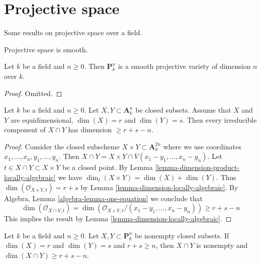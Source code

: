 \section{Projective space}
\label{section-projective-space}

\noindent
Some results on projective space over a field.

\begin{lemma}
\label{lemma-projective-space-smooth}
\begin{slogan}
Projective space is smooth.
\end{slogan}
Let $k$ be a field and $n \geq 0$. Then $\mathbf{P}^n_k$ is a
smooth projective variety of dimension $n$ over $k$.
\end{lemma}

\begin{proof}
Omitted.
\end{proof}

\begin{lemma}
\label{lemma-intersection-in-affine-space}
Let $k$ be a field and $n \geq 0$. Let $X, Y \subset \mathbf{A}^n_k$
be closed subsets. Assume that $X$ and $Y$ are equidimensional,
$\dim(X) = r$ and $\dim(Y) = s$.
Then every irreducible component of $X \cap Y$ has dimension $\geq r + s - n$.
\end{lemma}

\begin{proof}
Consider the closed subscheme $X \times Y \subset \mathbf{A}^{2n}_k$
where we use coordinates $x_1, \ldots, x_n, y_1, \ldots, y_n$. Then
$X \cap Y = X \times Y \cap V(x_1 - y_1, \ldots, x_n - y_n)$.
Let $t \in X \cap Y \subset X \times Y$ be a closed point.
By Lemma \ref{lemma-dimension-product-locally-algebraic}
we have $\dim_t(X \times Y) = \dim(X) + \dim(Y)$.
Thus $\dim(\mathcal{O}_{X \times Y, t}) = r + s$ by
Lemma \ref{lemma-dimension-locally-algebraic}.
By Algebra, Lemma \ref{algebra-lemma-one-equation}
we conclude that
$$
\dim(\mathcal{O}_{X \cap Y, t}) =
\dim(\mathcal{O}_{X \times Y, t}/(x_1 - y_1, \ldots, x_n - y_n)) \geq
r + s - n
$$
This implies the result by Lemma \ref{lemma-dimension-locally-algebraic}.
\end{proof}

\begin{lemma}
\label{lemma-intersection-in-projective-space}
Let $k$ be a field and $n \geq 0$. Let $X, Y \subset \mathbf{P}^n_k$
be nonempty closed subsets. If $\dim(X) = r$ and $\dim(Y) = s$ and
$r + s \geq n$, then $X \cap Y$ is nonempty and
$\dim(X \cap Y) \geq r + s - n$.
\end{lemma}

